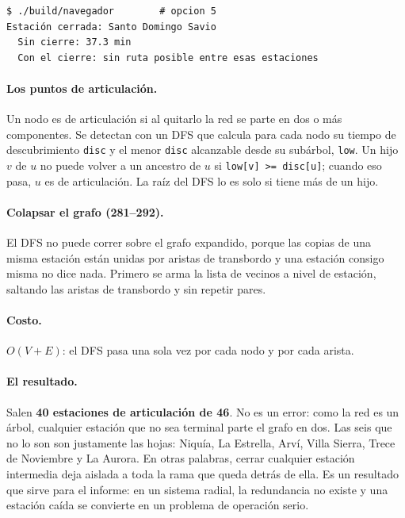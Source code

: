 \documentclass[11pt,a4paper]{article}
\newcommand{\arch}[1]{\texttt{#1}}
\begin{document}
\begin{lstlisting}[style=term]
$ ./build/navegador        # opcion 5
Estación cerrada: Santo Domingo Savio
  Sin cierre: 37.3 min
  Con el cierre: sin ruta posible entre esas estaciones
\end{lstlisting}

\paragraph{Los puntos de articulación.}
Un nodo es de articulación si al quitarlo la red se parte en dos o más componentes.
Se detectan con un DFS que calcula para cada nodo su tiempo de descubrimiento
\arch{disc} y el menor \arch{disc} alcanzable desde su subárbol, \arch{low}. Un
hijo $v$ de $u$ no puede volver a un ancestro de $u$ si \arch{low[v] >= disc[u]};
cuando eso pasa, $u$ es de articulación. La raíz del DFS lo es solo si tiene más
de un hijo.



\paragraph{Colapsar el grafo (281--292).}
El DFS no puede correr sobre el grafo expandido, porque las copias de una misma
estación están unidas por aristas de transbordo y una estación consigo misma no
dice nada. Primero se arma la lista de vecinos a nivel de estación, saltando las
aristas de transbordo y sin repetir pares.

\paragraph{Costo.}
$O(V+E)$: el DFS pasa una sola vez por cada nodo y por cada arista.

\paragraph{El resultado.}
Salen \textbf{40 estaciones de articulación de 46}. No es un error: como la red es
un árbol, cualquier estación que no sea terminal parte el grafo en dos. Las seis
que no lo son son justamente las hojas: Niquía, La Estrella, Arví, Villa Sierra,
Trece de Noviembre y La Aurora. En otras palabras, cerrar cualquier estación
intermedia deja aislada a toda la rama que queda detrás de ella. Es un resultado
que sirve para el informe: en un sistema radial, la redundancia no existe y una
estación caída se convierte en un problema de operación serio.
\end{document}

